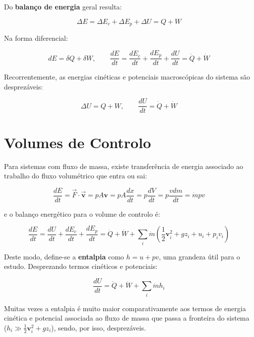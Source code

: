 Do \textbf{balanço de energia} geral resulta:

\begin{equation}
    \Delta E = \Delta E_c + \Delta E_p + \Delta U = Q + W
\end{equation}

Na forma diferencial:

\begin{equation}
    dE = \delta Q + \delta W, \qquad \frac{dE}{dt} = \frac{dE_c}{dt} + \frac{dE_p}{dt} + \frac{dU}{dt} = \dot{Q} + \dot{W}
\end{equation}

Recorrentemente, as energias cinéticas e potenciais macroscópicas do sistema são desprezáveis:

\begin{equation}
    \Delta U = Q + W, \qquad \frac{dU}{dt} = \dot{Q} + \dot{W}
\end{equation}


\section{Volumes de Controlo}

Para sistemas com fluxo de massa, existe transferência de energia associado ao trabalho do fluxo volumétrico que entra ou sai:

\begin{equation*}
    \frac{dE}{dt} = \vec{F} \cdot \vec{\mathbf{v}} = p A \mathbf{v} = p A \frac{dx}{dt} = p \frac{dV}{dt} = p \frac{v dm}{dt} = \dot{m} pv 
\end{equation*}

e o balanço energético para o volume de controlo é:

\begin{equation}
    \frac{dE}{dt} = \frac{dU}{dt} + \frac{dE_c}{dt} + \frac{dE_p}{dt} = \dot{Q} + \dot{W} + \sum_i \dot{m} \left( \frac{1}{2}\mathbf{v}_i^2 + gz_i + u_i + p_i v_i \right)
\end{equation}

Deste modo, define-se a \textbf{entalpia} como $h = u + pv$, uma grandeza útil para o estudo. Desprezando termos cinéticos e potenciais:

\begin{equation}
    \frac{dU}{dt} = \dot{Q} + \dot{W} + \sum_i \dot{m} h_i
\end{equation}

Muitas vezes a entalpia é muito maior comparativamente aos termos de energia cinética e potencial associada ao fluxo de massa que passa a fronteira do sistema ($h_i \gg \frac{1}{2}\mathbf{v}_i^2 + gz_i$), sendo, por isso, desprezáveis.
